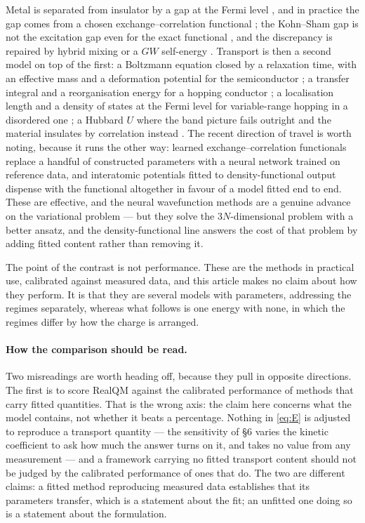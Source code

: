 \documentclass[11pt]{article}
\begin{document}
Metal is separated from insulator by a gap at the Fermi level \cite{ashcroft}, and in practice the gap comes from a chosen exchange--correlation
functional \cite{kohnsham}; the Kohn--Sham gap is not the excitation gap even for the exact
functional \cite{perdewlevy}, and the discrepancy is repaired by hybrid mixing or a $GW$ self-energy
\cite{hedin}. Transport is then a second model on top of the first: a Boltzmann equation closed by a
relaxation time, with an effective mass and a deformation potential for the semiconductor
\cite{bardeen}; a transfer integral and a reorganisation energy for a hopping conductor
\cite{marcus,holstein}; a localisation length and a density of states at the Fermi level for
variable-range hopping in a disordered one \cite{mott}; a Hubbard $U$ where the band picture fails
outright and the material insulates by correlation instead \cite{hubbard,imada}. The recent direction of travel is worth noting, because it runs the other way: learned
exchange--correlation functionals \cite{dm21} replace a handful of constructed parameters with a
neural network trained on reference data, and interatomic potentials fitted to density-functional
output \cite{mace} dispense with the functional altogether in favour of a model fitted end to end.
These are effective, and the neural wavefunction methods \cite{ferminet} are a genuine advance on
the variational problem --- but they solve the $3N$-dimensional problem with a better ansatz, and
the density-functional line answers the cost of that problem by adding fitted content rather than
removing it.

The point of the contrast is not performance. These are the methods in practical use, calibrated
against measured data, and this article makes no claim about how they perform. It is that they are
several models with parameters, addressing the regimes separately, whereas what follows is one
energy with none, in which the regimes differ by how the charge is arranged.

\paragraph{How the comparison should be read.} Two misreadings are worth heading off, because they
pull in opposite directions. The first is to score RealQM against the calibrated performance of
methods that carry fitted quantities. That is the wrong axis: the claim here concerns what the model
contains, not whether it beats a percentage. Nothing in \eqref{eq:E} is adjusted to reproduce a transport
quantity --- the sensitivity of \S6 varies the kinetic coefficient to ask how much the answer turns
on it, and takes no value from any measurement --- and a framework carrying no fitted transport
content should not be judged by the calibrated performance of ones that do. The two are different
claims: a fitted method reproducing measured data establishes that its parameters transfer, which is
a statement about the fit; an unfitted one doing so is a statement about the formulation.
\end{document}
